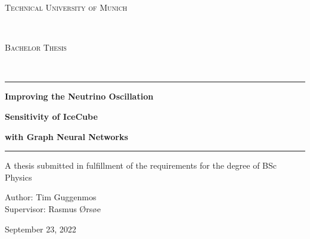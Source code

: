 \documentclass[a4paper,10pt]{scrartcl}
\begin{document}
\begin{center}
    \begin{huge}
        \textsc{Technical University of Munich}
    \end{huge}\\

    \vspace{2cm}

    \begin{Large}
        \textsc{Bachelor Thesis}
    \end{Large}\\

    \vspace{2cm}

    \par\noindent\rule{\textwidth}{0.2pt}
    \vspace{0.5cm}
    \begin{huge}
        \textbf{Improving the Neutrino Oscillation\\}
    \end{huge}
    \vspace{0.1cm}
    \begin{huge}
        \textbf{Sensitivity of IceCube\\}
    \end{huge}
    \vspace{0.3cm}
    \begin{huge}
        \textbf{with Graph Neural Networks}
    \end{huge}
    \vspace{0.5cm}
    \par\noindent\rule{\textwidth}{0.2pt}

    \vspace{2cm}

    A thesis submitted in fulfillment of the requirements for the degree of BSc Physics

    \vspace{2cm}

    \begin{large}
        Author: Tim Guggenmos\\
        \vspace{0.1cm}
        Supervisor: Rasmus Ørsøe
    \end{large}

    \vspace*{\fill}

    \begin{large}
        September 23, 2022
    \end{large}

\end{center}
\end{document}
